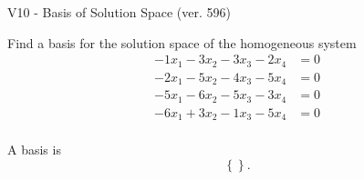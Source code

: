 \begin{exercise}
  \begin{exerciseTitle}V10 - Basis of Solution Space (ver. 596)\end{exerciseTitle}
  \begin{exerciseStatement}
    Find a basis for the solution space of the homogeneous system 
\begin{align*}
 -1 x_ 1 -3 x_ 2 -3 x_ 3 -2 x_ 4 &= 0  \\ 
  -2 x_ 1 -5 x_ 2 -4 x_ 3 -5 x_ 4 &= 0  \\ 
  -5 x_ 1 -6 x_ 2 -5 x_ 3 -3 x_ 4 &= 0  \\ 
  -6 x_ 1 + 3 x_ 2 -1 x_ 3 -5 x_ 4 &= 0  \\ 
 \end{align*}


 
  \end{exerciseStatement}

  \begin{exerciseAnswer}
   A basis is   
\[\left\{\right\}.\]

  


  \end{exerciseAnswer}
\end{exercise}